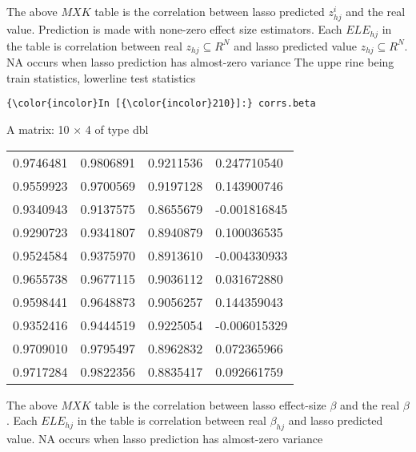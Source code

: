 \documentclass[11pt]{article}
\begin{document}
    
    The above \(MXK\) table is the correlation between lasso predicted
\(z^{i}_{hj}\) and the real value. Prediction is made with none-zero
effect size estimators. Each \(ELE_{hj}\) in the table is correlation
between real \(z_{hj} \subseteq R^{N}\) and lasso predicted value
\(z_{hj} \subseteq R^{N}\). NA occurs when lasso prediction has
almost-zero variance The uppe rine being train statistics, lowerline
test statistics

    \begin{Verbatim}[commandchars=\\\{\}]
{\color{incolor}In [{\color{incolor}210}]:} corrs.beta
\end{Verbatim}


    A matrix: 10 × 4 of type dbl
\begin{tabular}{llll}
	 0.9746481 & 0.9806891 & 0.9211536 &  0.247710540\\
	 0.9559923 & 0.9700569 & 0.9197128 &  0.143900746\\
	 0.9340943 & 0.9137575 & 0.8655679 & -0.001816845\\
	 0.9290723 & 0.9341807 & 0.8940879 &  0.100036535\\
	 0.9524584 & 0.9375970 & 0.8913610 & -0.004330933\\
	 0.9655738 & 0.9677115 & 0.9036112 &  0.031672880\\
	 0.9598441 & 0.9648873 & 0.9056257 &  0.144359043\\
	 0.9352416 & 0.9444519 & 0.9225054 & -0.006015329\\
	 0.9709010 & 0.9795497 & 0.8962832 &  0.072365966\\
	 0.9717284 & 0.9822356 & 0.8835417 &  0.092661759\\
\end{tabular}


    
    The above \(MXK\) table is the correlation between lasso effect-size
\(\beta\) and the real \(\beta\). Each \(ELE_{hj}\) in the table is
correlation between real \(\beta_{hj}\) and lasso predicted value. NA
occurs when lasso prediction has almost-zero variance
\end{document}

